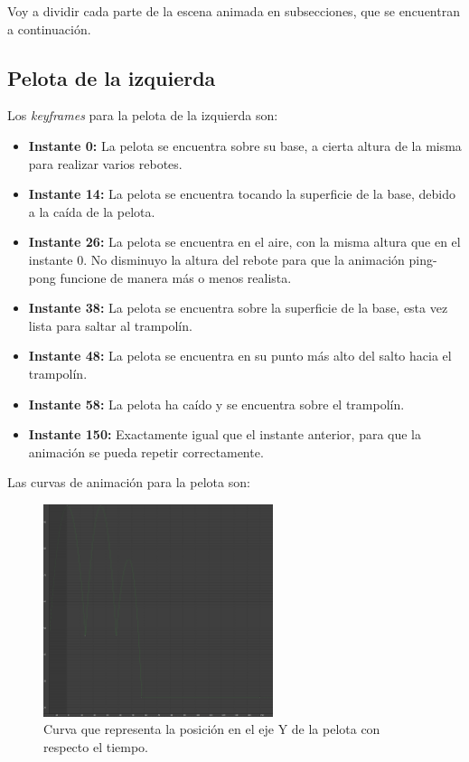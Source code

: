 \documentclass{article}
\begin{document}
\bigskip


Voy a dividir cada parte de la escena animada en subsecciones, que se encuentran a continuación.

\subsection{Pelota de la izquierda}

Los \textit{keyframes} para la pelota de la izquierda son:

\begin{itemize}
    \item \textbf{Instante 0: }La pelota se encuentra sobre su base, a cierta altura de la misma para realizar varios rebotes.
    \item \textbf{Instante 14: }La pelota se encuentra tocando la superficie de la base, debido a la caída de la pelota.
    \item \textbf{Instante 26: }La pelota se encuentra en el aire, con la misma altura que en el instante 0. No disminuyo la altura del rebote para que la animación ping-pong funcione de manera más o menos realista.
    \item \textbf{Instante 38: }La pelota se encuentra sobre la superficie de la base, esta vez lista para saltar al trampolín.
    \item \textbf{Instante 48: }La pelota se encuentra en su punto más alto del salto hacia el trampolín.
    \item \textbf{Instante 58: }La pelota ha caído y se encuentra sobre el trampolín.
    \item \textbf{Instante 150: }Exactamente igual que el instante anterior, para que la animación se pueda repetir correctamente.
\end{itemize}

\bigskip

Las curvas de animación para la pelota son:

\begin{figure}[H]
   \centering
   \includegraphics[width=0.6\textwidth]{imagenes/curvas/PL/pelota/green.png}
   \caption{Curva que representa la posición en el eje Y de la pelota con respecto el tiempo.}
\end{figure}
\end{document}
